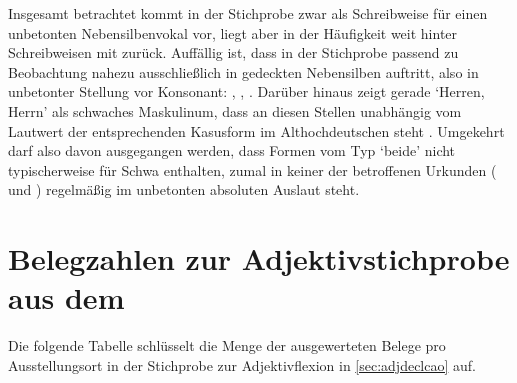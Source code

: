 Insgesamt betrachtet kommt  in der Stichprobe zwar als Schreibweise für
einen unbetonten Nebensilbenvokal vor, liegt aber in der Häufigkeit weit hinter
Schreibweisen mit  zurück. Auffällig ist, dass  in der Stichprobe
passend zu  Beobachtung nahezu
ausschließlich in gedeckten Nebensilben auftritt, also in unbetonter Stellung
vor Konsonant: , , .
Darüber hinaus zeigt gerade  `Herren, Herrn' als schwaches
Maskulinum, dass  an diesen Stellen unabhängig vom Lautwert der
entsprechenden Kasusform im Althochdeutschen steht
\autocite[vgl.][282--283]{braune2018}. Umgekehrt darf also davon ausgegangen
werden, dass Formen vom Typ  `beide' nicht typischerweise
 für Schwa enthalten, zumal in keiner der betroffenen Urkunden
(\cites(Nrn.~81, 190)[124,18--33; 205,30--45]{cao1} und
\cites(Nr.~N~230)[175,1--33]{cao5}) regelmäßig  im unbetonten absoluten
Auslaut steht.

\chapter{Belegzahlen zur Adjektivstichprobe aus dem }
\label{sec:caoadjquanttab}

Die folgende Tabelle schlüsselt die Menge der ausgewerteten Belege pro
Ausstellungsort in der Stichprobe zur Adjektivflexion in \cref{sec:adjdeclcao}
auf.



